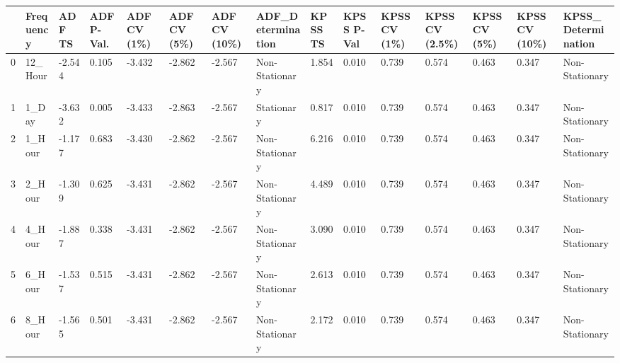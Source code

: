 \begin{tabular}{lllllllllllllll}
\toprule
 & Frequency & ADF TS & ADF P-Val. & ADF CV (1\%) & ADF CV (5\%) & ADF CV (10\%) & ADF_Determination & KPSS TS & KPSS P-Val & KPSS CV (1\%) & KPSS CV (2.5\%) & KPSS CV (5\%) & KPSS CV (10\%) & KPSS_Determination \\
\midrule
0 & 12_Hour & -2.544 & 0.105 & -3.432 & -2.862 & -2.567 & Non-Stationary & 1.854 & 0.010 & 0.739 & 0.574 & 0.463 & 0.347 & Non-Stationary \\
1 & 1_Day & -3.632 & 0.005 & -3.433 & -2.863 & -2.567 & Stationary & 0.817 & 0.010 & 0.739 & 0.574 & 0.463 & 0.347 & Non-Stationary \\
2 & 1_Hour & -1.177 & 0.683 & -3.430 & -2.862 & -2.567 & Non-Stationary & 6.216 & 0.010 & 0.739 & 0.574 & 0.463 & 0.347 & Non-Stationary \\
3 & 2_Hour & -1.309 & 0.625 & -3.431 & -2.862 & -2.567 & Non-Stationary & 4.489 & 0.010 & 0.739 & 0.574 & 0.463 & 0.347 & Non-Stationary \\
4 & 4_Hour & -1.887 & 0.338 & -3.431 & -2.862 & -2.567 & Non-Stationary & 3.090 & 0.010 & 0.739 & 0.574 & 0.463 & 0.347 & Non-Stationary \\
5 & 6_Hour & -1.537 & 0.515 & -3.431 & -2.862 & -2.567 & Non-Stationary & 2.613 & 0.010 & 0.739 & 0.574 & 0.463 & 0.347 & Non-Stationary \\
6 & 8_Hour & -1.565 & 0.501 & -3.431 & -2.862 & -2.567 & Non-Stationary & 2.172 & 0.010 & 0.739 & 0.574 & 0.463 & 0.347 & Non-Stationary \\
\bottomrule
\end{tabular}
